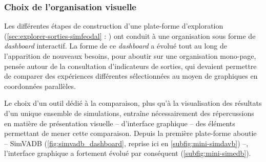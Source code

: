 \subsubsection{Choix de l'organisation visuelle}

Les différentes étapes de construction d'une plate-forme d'exploration (\cref{sec:explorer-sorties-simfeodal} : ) ont conduit à une organisation sous forme de \textit{dashboard} interactif.
La forme de ce \textit{dashboard} a évolué tout au long de l'apparition de nouveaux besoins, pour aboutir sur une organisation mono-page, pensée autour de la consultation d'indicateurs de sorties, qui devaient permettre de comparer des expériences différentes sélectionnées au moyen de graphiques en coordonnées parallèles.

Le choix d'un outil dédié à la comparaison, plus qu'à la visualisation des résultats d'un unique ensemble de simulations, entraîne nécessairement des répercussions en matière de présentation visuelle -- d'interface graphique -- des éléments permettant de mener cette comparaison.
Depuis la première plate-forme aboutie -- SimVADB (\cref{fig:simvadb_dashboard}, reprise ici en \cref{subfig:mini-simdavb}) --, l'interface graphique a fortement évolué par conséquent (\cref{subfig:mini-simedb}).
\vspace{-0.25cm}
